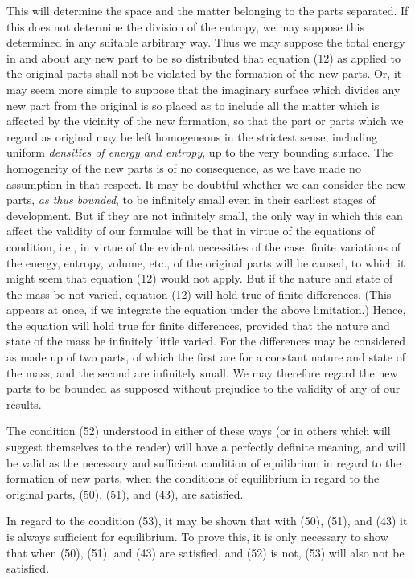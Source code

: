 \documentclass[12pt]{memoir}
\begin{document}
This will determine the space and the matter belonging to the parts separated. If this does not determine the division of the entropy, we may suppose this determined in any suitable arbitrary way. Thus we may suppose the total energy in and about any new part to be so distributed that equation (12) as applied to the original parts shall not be violated by the formation of the new parts. Or, it may seem more simple to suppose that the imaginary surface which divides any new part from the original is so placed as to include all the matter which is affected by the vicinity of the new formation, so that the part or parts which we regard as original may be left homogeneous in the strictest sense, including uniform \textit{densities of energy and entropy}, up to the very bounding surface. The homogeneity of the new parts is of no consequence, as we have made no assumption in that respect. It may be doubtful whether we can consider the new parts, \textit{as thus bounded}, to be infinitely small even in their earliest stages of development. But if they are not infinitely small, the only way in which this can affect the validity of our formulae will be that in virtue of the equations of condition, i.e., in virtue of the evident necessities of the case, finite variations of the energy, entropy, volume, etc., of the original parts will be caused, to which it might seem that equation (12) would not apply. But if the nature and state of the mass be not varied, equation (12) will hold true of finite differences. (This appears at once, if we integrate the equation under the above limitation.) Hence, the equation will hold true for finite differences, provided that the nature and state of the mass be infinitely little varied. For the differences may be considered as made up of two parts, of which the first are for a constant nature and state of the mass, and the second are infinitely small. We may therefore regard the new parts to be bounded as supposed without prejudice to the validity of any of our results.


The condition (52) understood in either of these ways (or in others which will suggest themselves to the reader) will have a perfectly definite meaning, and will be valid as the necessary and sufficient condition of equilibrium in regard to the formation of new parts, when the conditions of equilibrium in regard to the original parts, (50), (51), and (43), are satisfied.


In regard to the condition (53), it may be shown that with (50), (51), and (43) it is always sufficient for equilibrium. To prove this, it is only necessary to show that when (50), (51), and (43) are satisfied, and (52) is not, (53) will also not be satisfied.
\end{document}
